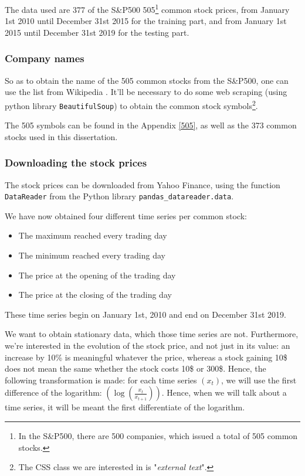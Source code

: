\documentclass[11pt]{article}
\newcommand{\code}[1]{\colorbox{light-gray}{\texttt{#1}}}
\begin{document}
\begin{onehalfspace}
The data used are 377 of the S\&P500 505\footnote{In the S\&P500, there are 500 companies, which issued a total of 505 common stocks.} common stock prices, from January 1st 2010 until December 31st 2015 for the training part, and from January 1st 2015 until December 31st 2019 for the testing part.

\subsubsection{Company names}

So as to obtain the name of the 505 common stocks from the S\&P500, one can use the list from Wikipedia \cite{500names}. It'll be necessary to do some web scraping (using python library \code{BeautifulSoup}) to obtain the common stock symbols\footnote{The CSS class we are interested in is "\textit{external text}".}. 

The 505 symbols can be found in the Appendix \ref{505}, as well as the 373 common stocks used in this dissertation. 

\subsubsection{Downloading the stock prices}

The stock prices can be downloaded from Yahoo Finance, using the function \code{DataReader} from the Python library \code{pandas\_datareader.data}.

We have now obtained four different time series per common stock:

\begin{itemize}
    \item The maximum reached every trading day
    \item The minimum reached every trading day
    \item The price at the opening of the trading day
    \item The price at the closing of the trading day
\end{itemize}

These time series begin on January 1st, 2010 and end on December 31st 2019.

We want to obtain stationary data\cite{stationary}, which those time series are not. Furthermore, we're interested in the evolution of the stock price, and not just in its value: an increase by 10\% is meaningful whatever the price, whereas a stock gaining 10\$ does not mean the same whether the stock costs 10\$ or 300\$. Hence, the following transformation is made: for each time series $(x_t)$, we will use the first difference of the logarithm: $\left(\log\left(\frac{x_t}{x_{t+1}}\right)\right)$. Hence, when we will talk about a time series, it will be meant the first differentiate of the logarithm.



\end{onehalfspace}
\end{document}
